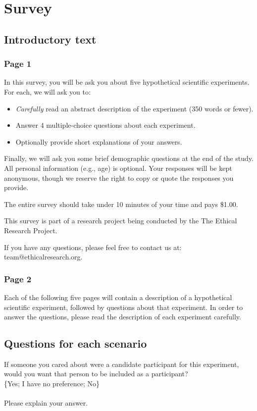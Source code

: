\section{Survey}

\subsection{Introductory text}

\subsubsection{Page 1}
In this survey, you will be ask you about five hypothetical scientific experiments. For each, we will ask you to:
\begin{itemize}
\item \textit{Carefully} read an abstract description of the experiment (350 words or fewer).
\item Answer 4 multiple-choice questions about each experiment.
\item Optionally provide short explanations of your answers.
\end{itemize}
Finally, we will ask you some brief demographic questions at the end of the study. All personal information (e.g., age) is optional. Your responses will be kept anonymous, though we reserve the right to copy or quote the responses you provide.

The entire survey should take under 10 minutes of your time and pays \$1.00.

This survey is part of a research project being conducted by the The Ethical Research Project.

If you have any questions, please feel free to contact us at: team@ethicalresearch.org.

\subsubsection{Page 2}
Each of the following five pages will contain a description of a hypothetical scientific experiment, followed by questions about that experiment. In order to answer the questions, please read the description of each experiment carefully.

\subsection{Questions for each scenario}

\noindent
If someone you cared about were a candidate participant for this experiment, would you want that person to be included as a participant?
\\
\{Yes; I have no preference; No\}
\\
\\
Please explain your answer.

